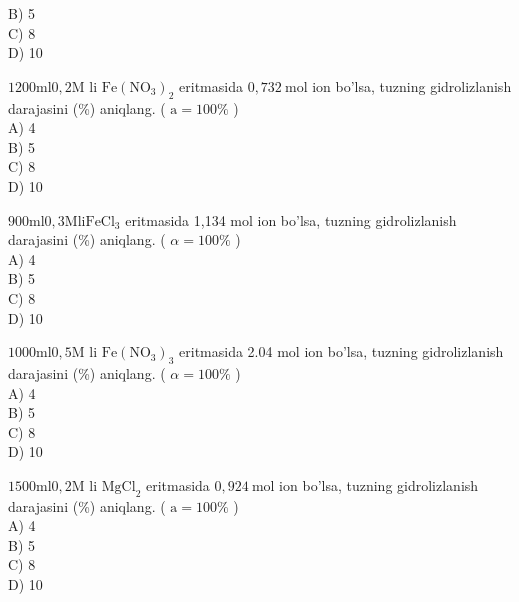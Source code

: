 B) 5\\
C) 8\\
D) 10
  \item $1200 \mathrm{ml} 0,2 \mathrm{M}$ li $\mathrm{Fe}\left(\mathrm{NO}_{3}\right)_{2}$ eritmasida $0,732 \mathrm{~mol}$ ion bo'lsa, tuzning gidrolizlanish darajasini (\%) aniqlang. ( $\mathrm{a}=100 \%$ )\\
A) 4\\
B) 5\\
C) 8\\
D) 10
  \item $900 \mathrm{ml} 0,3 \mathrm{M} \mathrm{li} \mathrm{FeCl}{ }_{3}$ eritmasida 1,134 mol ion bo'lsa, tuzning gidrolizlanish darajasini (\%) aniqlang. ( $\alpha=100 \%$ )\\
A) 4\\
B) 5\\
C) 8\\
D) 10
  \item $1000 \mathrm{ml} 0,5 \mathrm{M}$ li $\mathrm{Fe}\left(\mathrm{NO}_{3}\right)_{3}$ eritmasida 2.04 mol ion bo'lsa, tuzning gidrolizlanish darajasini (\%) aniqlang. ( $\alpha=100 \%$ )\\
A) 4\\
B) 5\\
C) 8\\
D) 10
  \item $1500 \mathrm{ml} 0,2 \mathrm{M}$ li $\mathrm{MgCl}_{2}$ eritmasida $0,924 \mathrm{~mol}$ ion bo'lsa, tuzning gidrolizlanish darajasini (\%) aniqlang. ( $\mathrm{a}=100 \%$ )\\
A) 4\\
B) 5\\
C) 8\\
D) 10